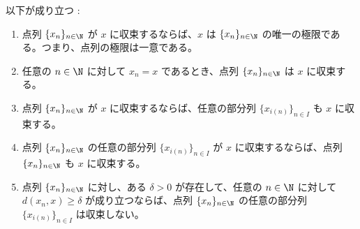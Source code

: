 \documentclass[article,paper=a4paper]{jlreq}
\begin{document}
\begin{prop}
以下が成り立つ :
\begin{enumerate}[label=(\arabic*)\,]
    \item 点列 $\{x_n\}_{n \in \N}$ が $x$ に収束するならば、$x$ は $\{x_n\}_{n \in \N}$ の唯一の極限である。つまり、点列の極限は一意である。
    \item 任意の $n \in \N$ に対して $x_n = x$ であるとき、点列 $\{x_n\}_{n \in \N}$ は $x$ に収束する。
    \item 点列 $\{x_n\}_{n \in \N}$ が $x$ に収束するならば、任意の部分列 $\{x_{i(n)}\}_{n \in I}$ も $x$ に収束する。
    \item 点列 $\{x_n\}_{n \in \N}$ の任意の部分列 $\{x_{i(n)}\}_{n \in I}$ が $x$ に収束するならば、点列 $\{x_n\}_{n \in \N}$ も $x$ に収束する。
    \item 点列 $\{x_n\}_{n \in \N}$ に対し、ある $\delta > 0$ が存在して、任意の $n \in \N$ に対して $d(x_n, x) \geq \delta$ が成り立つならば、点列 $\{x_n\}_{n \in \N}$ の任意の部分列 $\{x_{i(n)}\}_{n \in I}$ は収束しない。
\end{enumerate}
\end{prop}
\end{document}
